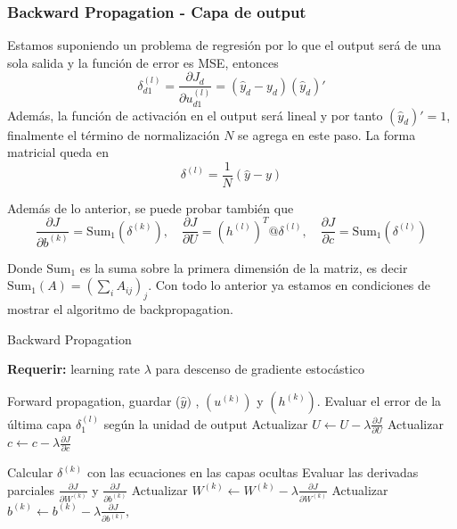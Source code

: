 \subsubsection{Backward Propagation - Capa de output}

Estamos suponiendo un problema de regresión por lo que el output será de una sola salida y la función de error es MSE, entonces 
\[
\delta_{d1}^{(l)} = \frac{\partial J_d}{\partial u_{d1}^{(l)}} = (\hat{y}_d-y_d) (\hat{y}_d)' 
\] 
Además, la función de activación en el output será lineal y por tanto $(\hat{y}_d)' = 1$, finalmente el término de normalización $N$ se agrega en este paso.  La forma matricial queda en 
\begin{equation}
\label{eq:capa_output}
\delta^{(l)} = \frac{1}{N}(\hat{y}-y) 
\end{equation}

Además de lo anterior, se puede probar también que 
\begin{equation}
	\frac{\partial J}{\partial b^{(k)}} = \text{Sum}_1 \left ( \delta^{(k)} \right ), \quad \frac{\partial J}{\partial U} = (h^{(l)})^T @ \delta^{(l)}, \quad \frac{\partial J}{\partial c} = \text{Sum}_1 \left ( \delta^{(l)}\right )
\end{equation}

Donde $\text{Sum}_1$ es la suma sobre la primera dimensión de la matriz, es decir  $\text{Sum}_1(A) = (\sum_{i}A_{ij})_j$. Con todo lo anterior ya estamos en condiciones de mostrar el algoritmo de backpropagation.

\begin{algorithm}[H]
	\caption{Backward Propagation} \label{ML:Algorithm2}
	\textbf{Requerir: } learning rate $\lambda$ para descenso de gradiente estocástico
	\begin{algorithmic}[1]
	\State Forward propagation, guardar  ($\hat{y})$ , $(u^{(k)})$ y $(h^{(k)})$.
	\State Evaluar el error de la última capa $\delta_1^{(l)}$  según la unidad de output
	\State  Actualizar $U \gets U - \lambda \frac{\partial J}{\partial U}$
	\State Actualizar $c \gets c - \lambda \frac{\partial J}{\partial c}$
		
		\State Calcular $\delta^{(k)}$ con las ecuaciones en las capas ocultas
		\State Evaluar las derivadas parciales $\frac{\partial J}{\partial W^{(k)}}$ y $\frac{\partial J}{\partial b^{(k)}}$
		\State Actualizar $W^{(k)} \gets W^{(k)} - \lambda \frac{\partial J}{\partial W^{(k)}}$
		\State Actualizar $b^{(k)} \gets b^{(k)} - \lambda \frac{\partial J}{\partial b^{(k)}}, \quad$
		
	\EndFor

	\end{algorithmic}
	
\end{algorithm}

